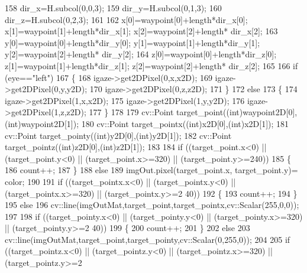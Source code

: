 \begin{DoxyCode}
158             dir\_x=H.subcol(0,0,3);
159             dir\_y=H.subcol(0,1,3);
160             dir\_z=H.subcol(0,2,3);
161 
162             x[0]=waypoint[0]+length*dir\_x[0]; x[1]=waypoint[1]+length*dir\_x[1]; x[2]=waypoint[2]+length*
      dir\_x[2];
163             y[0]=waypoint[0]+length*dir\_y[0]; y[1]=waypoint[1]+length*dir\_y[1]; y[2]=waypoint[2]+length*
      dir\_y[2];
164             z[0]=waypoint[0]+length*dir\_z[0]; z[1]=waypoint[1]+length*dir\_z[1]; z[2]=waypoint[2]+length*
      dir\_z[2];
165 
166             \textcolor{keywordflow}{if} (eye==\textcolor{stringliteral}{"left"})
167             \{
168                 igaze->get2DPixel(0,x,x2D);
169                 igaze->get2DPixel(0,y,y2D);
170                 igaze->get2DPixel(0,z,z2D);
171             \}
172             \textcolor{keywordflow}{else}
173             \{
174                 igaze->get2DPixel(1,x,x2D);
175                 igaze->get2DPixel(1,y,y2D);
176                 igaze->get2DPixel(1,z,z2D);
177             \}
178 
179             cv::Point  target\_point((\textcolor{keywordtype}{int})waypoint2D[0],(\textcolor{keywordtype}{int})waypoint2D[1]);
180             cv::Point  target\_pointx((\textcolor{keywordtype}{int})x2D[0],(\textcolor{keywordtype}{int})x2D[1]);
181             cv::Point  target\_pointy((\textcolor{keywordtype}{int})y2D[0],(\textcolor{keywordtype}{int})y2D[1]);
182             cv::Point  target\_pointz((\textcolor{keywordtype}{int})z2D[0],(\textcolor{keywordtype}{int})z2D[1]);
183 
184             \textcolor{keywordflow}{if} ((target\_point.x<0) || (target\_point.y<0) || (target\_point.x>=320) || (target\_point.y>=240))
185             \{
186                 count++;
187             \}
188             \textcolor{keywordflow}{else}
189                 imgOut.pixel(target\_point.x, target\_point.y)= color;
190 
191             \textcolor{keywordflow}{if} ((target\_pointx.x<0) || (target\_pointx.y<0) || (target\_pointx.x>=320) || (target\_pointx.y>=2
      40))
192             \{
193                 count++;
194             \}
195             \textcolor{keywordflow}{else}
196                 cv::line(imgOutMat,target\_point,target\_pointx,cv::Scalar(255,0,0));
197 
198             \textcolor{keywordflow}{if} ((target\_pointy.x<0) || (target\_pointy.y<0) || (target\_pointy.x>=320) || (target\_pointy.y>=2
      40))
199             \{
200                 count++;
201             \}
202             \textcolor{keywordflow}{else}
203                 cv::line(imgOutMat,target\_point,target\_pointy,cv::Scalar(0,255,0));
204 
205             \textcolor{keywordflow}{if} ((target\_pointz.x<0) || (target\_pointz.y<0) || (target\_pointz.x>=320) || (target\_pointz.y>=2

\end{DoxyCode}
